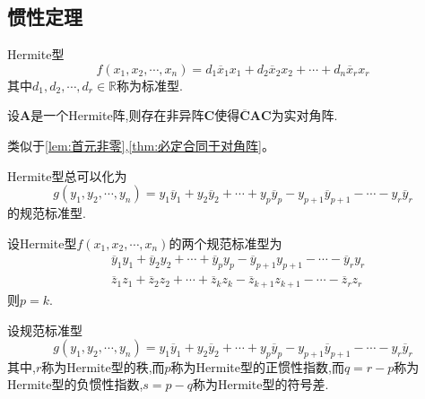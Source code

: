 \subsection{惯性定理}
\begin{formal}
    \begin{definition}[标准型的定义]\label{def:标准型的定义}
        \textup{Hermite}型\[
        f\left(
            x_1,x_2,\cdots,x_n
        \right)=d_1\overline{x}_1x_1+d_2\overline{x}_2x_2+\cdots+d_n\overline{x}_rx_r
        \]其中$d_1,d_2,\cdots,d_r\in\mathbb{R}$称为标准型.
    \end{definition}
\end{formal}
\begin{formal}
    \begin{theorem}[Hermite阵对角化]\label{thm:Hermite阵对角化}
        设$\bm{A}$是一个\textup{Hermite}阵,则存在非异阵$\bm{C}$使得$\overline{\bm{C}}\bm{AC}$为实对角阵.
    \end{theorem}
    \begin{Proof}
        类似于\cref{lem:首元非零},\cref{thm:必定合同于对角阵}。
    \end{Proof}
\end{formal}
\begin{formal}
    \begin{definition}[规范标准型的定义]\label{def:规范标准型的定义}
        \textup{Hermite}型总可以化为\[
       g\left(
        y_1,y_2,\cdots,y_n
       \right)=y_1\overline{y}_1+y_2\overline{y}_2+\cdots+y_p\overline{y}_p-
         y_{p+1}\overline{y}_{p+1}-\cdots-y_r\overline{y}_r
        \]的规范标准型.
    \end{definition}
\end{formal}
\begin{formal}
    \begin{theorem}[Hermite型的惯性定理]\label{thm:Hermite型的惯性定理}
        设\textup{Hermite}型$f\left(x_1,x_2,\cdots,x_n\right)$的两个规范标准型为\begin{align*}
            &\overline{y}_1y_1+\overline{y}_2y_2+\cdots+\overline{y}_py_p-\overline{y}_{p+1}y_{p+1}-\cdots-\overline{y}_ry_r\\
            &\overline{z}_1z_1+\overline{z}_2z_2+\cdots+\overline{z}_kz_k-\overline{z}_{k+1}z_{k+1}-\cdots-\overline{z}_rz_r
        \end{align*}则$p=k.$
    \end{theorem}
\end{formal}
\begin{formal}
    \begin{definition}[惯性指数的定义]\label{def:惯性指数的定义2}
        设规范标准型\[
        g\left(
            y_1,y_2,\cdots,y_n
        \right)=y_1\overline{y}_1+y_2\overline{y}_2+\cdots+y_p\overline{y}_p-
        y_{p+1}\overline{y}_{p+1}-\cdots-y_r\overline{y}_r
        \]其中,$r$称为\textup{Hermite}型的秩,而$p$称为\textup{Hermite}型的正惯性指数,而$q=r-p$称为\textup{Hermite}型的负惯性指数,$s=p-q$称为\textup{Hermite}型的符号差.
    \end{definition}
\end{formal}
